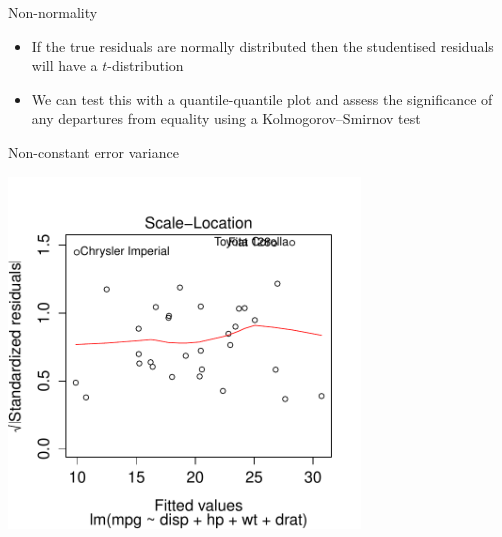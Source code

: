 \begin{frame}{Non-normality}
  \begin{itemize}
    \item If the true residuals are normally distributed then the studentised residuals will have a $t$-distribution
    \pause
    \vspace{\baselineskip}
    \item We can test this with a quantile-quantile plot and assess the significance of any departures from equality using a Kolmogorov--Smirnov test
    \pause
  \end{itemize}
  \begin{center}
  \end{center}
\end{frame}

\begin{frame}{Non-constant error variance}
  \begin{center}
    \includegraphics[width=0.7\textwidth]{figures/scale-location.pdf}
  \end{center}
\end{frame}

